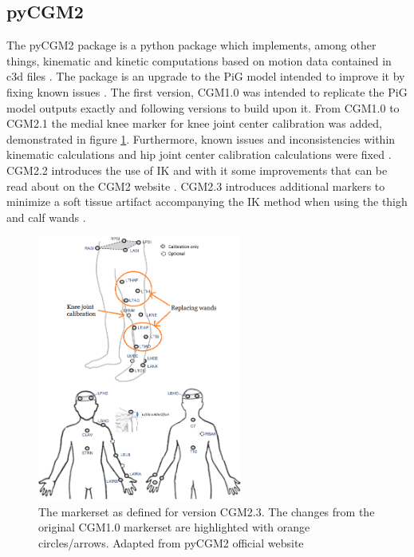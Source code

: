 \documentclass[../main.tex]{subfiles}
\begin{document}
\subsection{pyCGM2}
\label{sec:A-pyCGM2}
The pyCGM2 package is a python package which implements, among other things, kinematic and kinetic computations based on motion data contained in c3d files \cite{Leboeuf2019}.
The package is an upgrade to the \ac{PiG} model intended to improve it by fixing known issues \cite{Leboeuf2019}.
The first version, CGM1.0 was intended to replicate the \ac{PiG} model outputs exactly and following versions to build upon it.
From CGM1.0 to CGM2.1 the medial knee marker for knee joint center calibration was added, demonstrated in figure \ref{fig:cgm23-markerset-sota}.
Furthermore, known issues and inconsistencies within kinematic calculations and hip joint center calibration calculations were fixed \cite{Leboeuf2019}.
CGM2.2 introduces the use of \ac{IK} and with it some improvements that can be read about on the CGM2 website \cite{cgm22}. 
CGM2.3 introduces additional markers to minimize a soft tissue artifact accompanying the \ac{IK} method when using the thigh and calf wands \cite{cgm23}.
\begin{figure}[!hbt]
    \centering
    \includegraphics[width=0.6\textwidth]{img/CGM23_markerset_highlight.png}
    \caption{The markerset as defined for version CGM2.3. The changes from the original CGM1.0 markerset are highlighted with orange circles/arrows. Adapted from pyCGM2 official website \cite{cgm23}}
    \label{fig:cgm23-markerset-sota}
\end{figure}
\end{document}
